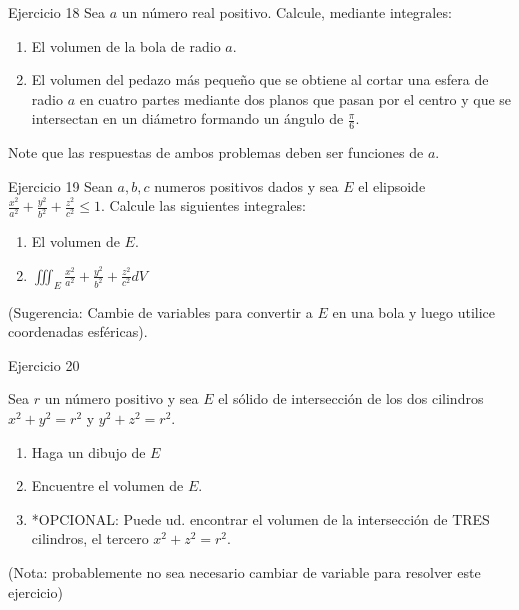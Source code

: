 \documentclass[usepdftitle=false]{beamer}
\begin{document}
\begin{frame}{Ejercicio 18}
Sea $a$ un n\'umero real positivo. Calcule, mediante integrales:
\begin{enumerate}
\item El volumen de la bola de radio $a$.

\item El volumen del pedazo m\'as peque\~no que se obtiene al cortar una esfera de radio $a$ en cuatro partes mediante dos planos que pasan por el centro y que se intersectan en un di\'ametro formando un \'angulo de $\frac{\pi}{6}$.
\end{enumerate}
Note que las respuestas de ambos problemas deben ser funciones de $a$.
\end{frame}


\begin{frame}{Ejercicio 19}
Sean $a,b,c$ numeros positivos dados y sea $E$ el elipsoide $\frac{x^2}{a^2}+ \frac{y^2}{b^2} + \frac{z^2}{c^2}\leq 1$. Calcule las siguientes integrales:
\begin{enumerate}
\item El volumen de $E$.
\item $\iiint_E \frac{x^2}{a^2}+ \frac{y^2}{b^2} + \frac{z^2}{c^2}dV$
\end{enumerate}
(Sugerencia: Cambie de variables para convertir a $E$ en una bola y luego utilice coordenadas esf\'ericas).
\end{frame}

\begin{frame}{Ejercicio 20} 

Sea $r$ un n\'umero positivo y sea $E$ el s\'olido de intersecci\'on de los dos cilindros $x^2+y^2=r^2$ y $y^2+z^2=r^2$.
\begin{enumerate}
\item Haga un dibujo de $E$
\item Encuentre el volumen de $E$.
\item *OPCIONAL: Puede ud. encontrar el volumen de la intersecci\'on de TRES cilindros, el tercero $x^2+z^2=r^2$.
\end{enumerate}
(Nota: probablemente no sea necesario cambiar de variable para resolver este ejercicio)
\end{frame}
\end{document}
